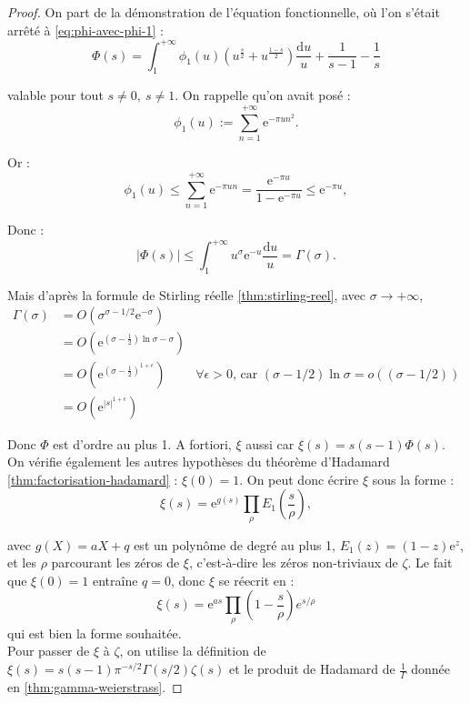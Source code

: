 \documentclass[french]{report}
\begin{document}
\begin{proof}
  On part de la démonstration de l'équation fonctionnelle, où l'on s'était arrêté à \ref{eq:phi-avec-phi-1} : 
  \[
    \Phi(s)
    = \int_1^{+\infty}\phi_1(u)\left(u^{\frac{s}{2}}+u^{\frac{1-s}{2}}\right)\frac{\mathrm{d}u}{u} + \frac{1}{s-1}-\frac{1}{s}  
  \]

  valable pour tout $s\neq 0,\ s\neq 1$. On rappelle qu'on avait posé :
  \[
    \phi_1(u)
    :=\sum_{n=1}^{+\infty}\mathrm{e}^{-\pi un^2}.
  \]

  Or :
  \[
    \phi_1(u)
    \leq \sum_{n=1}^{+\infty}\mathrm{e}^{-\pi un}
    =\frac{\mathrm{e}^{-\pi u}}{1-\mathrm{e}^{-\pi u}}
    \leq \mathrm{e}^{-\pi u},
  \]

  Donc :
  \[
    |\Phi(s)|
    \leq \int_1^{+\infty}u^{\sigma}\mathrm{e}^{-u}\frac{\mathrm{d}u}{u}
    =\Gamma(\sigma).
  \]

  Mais d'après la formule de Stirling réelle \ref{thm:stirling-reel}, avec $\sigma\to+\infty$,
  \begin{align*}
    \Gamma(\sigma)
    &= O(\sigma^{\sigma-1/2}\mathrm{e}^{-\sigma})
    & \\
    &= O(\mathrm{e}^{(\sigma-\frac{1}{2})\ln\sigma - \sigma})
    & \\
    &= O(\mathrm{e}^{(\sigma-\frac{1}{2})^{1+\epsilon}})
    & \text{$\forall\epsilon>0$,\ car $\left(\sigma-1/2\right)\ln\sigma = o\left(\left(\sigma-1/2\right)\right)$} \\
    &= O(\mathrm{e}^{|s|^{1+\epsilon}}) &
  \end{align*}

  Donc $\Phi$ est d'ordre au plus 1. A fortiori, $\xi$ aussi car $\xi(s)=s(s-1)\Phi(s)$. On vérifie également les autres hypothèses du théorème d'Hadamard \ref{thm:factorisation-hadamard} : $\xi(0)=1$. On peut donc écrire $\xi$ sous la forme :
  \[
    \xi(s)
    = \mathrm{e}^{g(s)}\prod_\rho E_1\left(\frac{s}{\rho}\right),
  \]

  avec $g(X)=aX+q$ est un polynôme de degré au plus 1, $E_1(z)=(1-z)\mathrm{e}^{z}$, et les $\rho$ parcourant les zéros de $\xi$, c'est-à-dire les zéros non-triviaux de $\zeta$. Le fait que $\xi(0)=1$ entraîne $q=0$, donc $\xi$ se réecrit en :
  \[
    \xi(s)
    = \mathrm{e}^{as}\prod_\rho \left(1-\frac{s}{\rho}\right)e^{s/\rho}
  \]
  qui est bien la forme souhaitée.
  \\

  Pour passer de $\xi$ à $\zeta$, on utilise la définition de $\xi(s)= s(s-1)\pi^{-s/2}\Gamma(s/2)\zeta(s)$ et le produit de Hadamard de $\frac{1}{\Gamma}$ donnée en \ref{thm:gamma-weierstrass}.
\end{proof}
\end{document}
